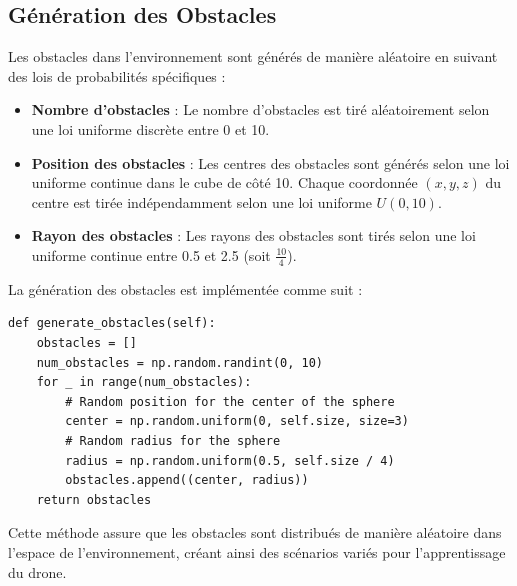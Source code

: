 \documentclass[a4paper, 12pt]{article}
\begin{document}
\subsection{Génération des Obstacles}
Les obstacles dans l'environnement sont générés de manière aléatoire en suivant des lois de probabilités spécifiques :
\begin{itemize}
    \item \textbf{Nombre d'obstacles} : Le nombre d'obstacles est tiré aléatoirement selon une loi uniforme discrète entre 0 et 10.
    \item \textbf{Position des obstacles} : Les centres des obstacles sont générés selon une loi uniforme continue dans le cube de côté 10. Chaque coordonnée $(x, y, z)$ du centre est tirée indépendamment selon une loi uniforme $U(0, 10)$.
    \item \textbf{Rayon des obstacles} : Les rayons des obstacles sont tirés selon une loi uniforme continue entre 0.5 et 2.5 (soit $\frac{10}{4}$).
\end{itemize}

La génération des obstacles est implémentée comme suit :
\begin{verbatim}
def generate_obstacles(self):
    obstacles = []
    num_obstacles = np.random.randint(0, 10)
    for _ in range(num_obstacles):
        # Random position for the center of the sphere
        center = np.random.uniform(0, self.size, size=3)
        # Random radius for the sphere
        radius = np.random.uniform(0.5, self.size / 4)
        obstacles.append((center, radius))
    return obstacles
\end{verbatim}

Cette méthode assure que les obstacles sont distribués de manière aléatoire dans l'espace de l'environnement, créant ainsi des scénarios variés pour l'apprentissage du drone.
\end{document}
